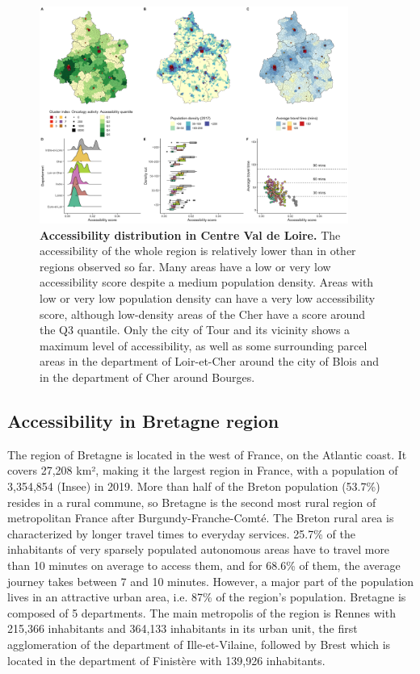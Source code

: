 \begin{figure}[h!]
    \includegraphics[width=0.9\textwidth]{images/camion/region_accessibility/accessibility_Centre-Val-de-Loire.png}
    \centering
    \caption{ \textbf{Accessibility distribution in Centre Val de Loire.} The
        accessibility of the whole region is relatively lower than in other
        regions observed so far. Many areas have a low or very low accessibility
        score despite a medium population density. Areas with low or very low
        population density can have a very low accessibility score, although
        low-density areas of the Cher have a score around the Q3 quantile. Only
        the city of Tour and its vicinity shows a maximum level of
        accessibility, as well as some surrounding parcel areas in the
        department of Loir-et-Cher around the city of Blois and in the
        department of Cher around Bourges. }
\end{figure}

\subsection*{Accessibility in Bretagne region}

The region of Bretagne is located in the west of France, on the Atlantic coast.
It covers 27,208 km², making it the largest region in France, with a population
of 3,354,854 (Insee) in 2019. More than half of the Breton population (53.7\%)
resides in a rural commune, so Bretagne is the second most rural region of
metropolitan France after Burgundy-Franche-Comté. The Breton rural area is
characterized by longer travel times to everyday services. 25.7\% of the
inhabitants of very sparsely populated autonomous areas have to travel more than
10 minutes on average to access them, and for 68.6\% of them, the average
journey takes between 7 and 10 minutes. However, a major part of the population
lives in an attractive urban area, i.e. 87\% of the region's population.
Bretagne is composed of 5 departments. The main metropolis of the region is
Rennes with 215,366 inhabitants and 364,133 inhabitants in its urban unit, the
first agglomeration of the department of Ille-et-Vilaine, followed by Brest
which is located in the department of Finistère with 139,926 inhabitants.

